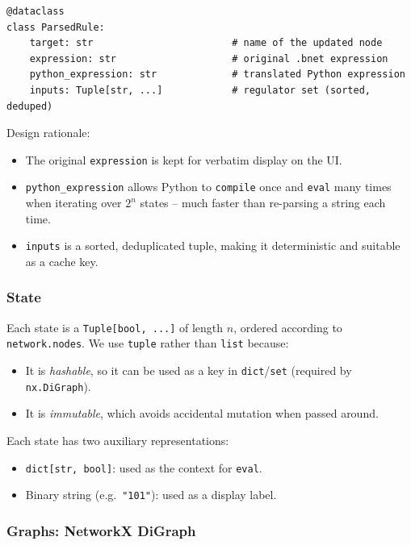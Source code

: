 \documentclass[oneside,final]{hcmut-report}
\begin{document}
\begin{lstlisting}[caption={The \texttt{ParsedRule} data class}, label={lst:parsedrule}]
@dataclass
class ParsedRule:
    target: str                        # name of the updated node
    expression: str                    # original .bnet expression
    python_expression: str             # translated Python expression
    inputs: Tuple[str, ...]            # regulator set (sorted, deduped)
\end{lstlisting}

Design rationale:
\begin{itemize}[leftmargin=*]
    \item The original \texttt{expression} is kept for verbatim display on the UI.
    \item \texttt{python\_expression} allows Python to \texttt{compile} once and \texttt{eval} many times when iterating over $2^n$ states -- much faster than re-parsing a string each time.
    \item \texttt{inputs} is a sorted, deduplicated tuple, making it deterministic and suitable as a cache key.
\end{itemize}

\subsubsection{State}

Each state is a \texttt{Tuple[bool, ...]} of length $n$, ordered according to \texttt{network.nodes}. We use \texttt{tuple} rather than \texttt{list} because:
\begin{itemize}[leftmargin=*]
    \item It is \textit{hashable}, so it can be used as a key in \texttt{dict}/\texttt{set} (required by \texttt{nx.DiGraph}).
    \item It is \textit{immutable}, which avoids accidental mutation when passed around.
\end{itemize}

Each state has two auxiliary representations:
\begin{itemize}[leftmargin=*]
    \item \texttt{dict[str, bool]}: used as the context for \texttt{eval}.
    \item Binary string (e.g.\ \texttt{"101"}): used as a display label.
\end{itemize}

\subsubsection{Graphs: NetworkX DiGraph}
\end{document}
